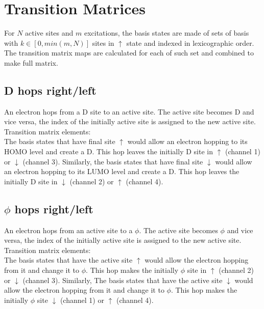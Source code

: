\documentclass[a4paper,twocolumn]{revtex4-1} %
\newcommand{\da}{\downarrow}
\newcommand{\ua}{\uparrow}
\begin{document}
\section{Transition Matrices}
For $N$ active sites and $m$ excitations,
the basis states are made of sets of basis with $k\in [0,min(m,N)]$ sites in $\ua$ state
and indexed in lexicographic order.
The transition matrix maps are calculated for each of such set and combined to make full matrix.


\subsection{D hops right/left}
An electron hops from a D site to an active site.
The active site becomes D and vice versa, the index of the initially active site is assigned to the new active site. 
\\Transition matrix elements:\\
The basis states that have final site $\ua$ would allow 
an electron hopping to its HOMO level and create a D.
This hop leaves the initially D site in $\ua$ (channel 1) or $\da$  (channel 3).
Similarly,
the basis states that have final site $\da$ would allow 
an electron hopping to its LUMO level and create a D.
This hop leaves the initially D site in $\da$ (channel 2) or $\ua$  (channel 4).



\subsection{$\phi$ hops right/left}
An electron hops from an active site to a $\phi$.
The active site becomes $\phi$ and vice versa, the index of the initially active site is assigned to the new active site. 
\\Transition matrix elements:\\
The basis states that have the active site $\ua$ would allow 
the electron hopping from it and change it to $\phi$.
This hop makes the initially $\phi$ site in $\ua$ (channel 2) or $\da$  (channel 3).
Similarly,
The basis states that have the active site $\da$ would allow 
the electron hopping from it and change it to $\phi$.
This hop makes the initially $\phi$ site $\da$ (channel 1) or $\ua$  (channel 4).
\end{document}
